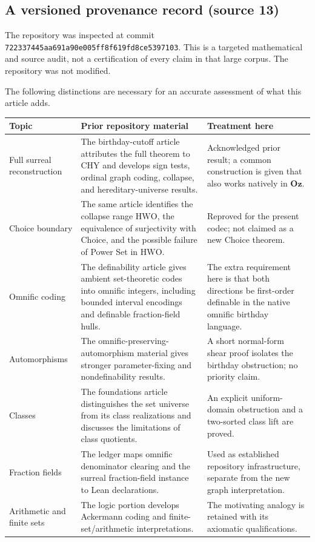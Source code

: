 \documentclass[11pt,letterpaper]{article}
\theoremstyle{definition}
\theoremstyle{remark}
\newcommand{\HWO}{\mathrm{HWO}}
\newcommand{\Oz}{\mathbf{Oz}}
\begin{document}
\subsection{A versioned provenance record (source 13)}
\label{hset:sf:sub:repo}

The repository was inspected at commit
\texttt{722337445aa691a90e005ff8f619fd8ce5397103}. This is a targeted mathematical and
source audit, not a certification of every claim in that large corpus. The
repository was not modified.

The following distinctions are necessary for an accurate assessment of what this
article adds.

\begin{center}\small
\begin{longtable}{@{}P{0.21\textwidth}P{0.40\textwidth}P{0.31\textwidth}@{}}
\toprule
Topic & Prior repository material & Treatment here\\
\midrule\endhead
Full surreal reconstruction & The birthday-cutoff article attributes the full
theorem to CHY and develops sign tests, ordinal graph coding, collapse, and
hereditary-universe results. & Acknowledged prior result; a common construction is
given that also works natively in $\Oz$.\\
Choice boundary & The same article identifies the collapse range $\HWO$, the
equivalence of surjectivity with Choice, and the possible failure of Power Set in
$\HWO$. & Reproved for the present codec; not claimed as a new Choice theorem.\\
Omnific coding & The definability article gives ambient set-theoretic codes into
omnific integers, including bounded interval encodings and definable fraction-field
hulls. & The extra requirement here is that both directions be first-order definable
in the native omnific birthday language.\\
Automorphisms & The omnific-preserving-automorphism material gives stronger
parameter-fixing and nondefinability results. & A short normal-form shear proof
isolates the birthday obstruction; no priority claim.\\
Classes & The foundations article distinguishes the set universe from its class
realizations and discusses the limitations of class quotients. & An explicit
uniform-domain obstruction and a two-sorted class lift are proved.\\
Fraction fields & The ledger maps omnific denominator clearing and the surreal
fraction-field instance to Lean declarations. & Used as established repository
infrastructure, separate from the new graph interpretation.\\
Arithmetic and finite sets & The logic portion develops Ackermann coding and
finite-set/arithmetic interpretations. & The motivating analogy is retained with its
axiomatic qualifications.\\
\bottomrule
\end{longtable}
\end{center}
\end{document}
